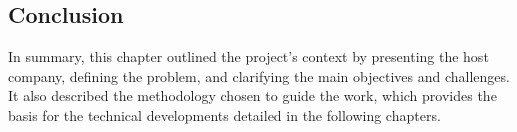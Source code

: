 \begin{spacing}{1.2}
\section*{Conclusion}
In summary, this chapter outlined the project’s context by presenting the host company, defining the problem, and clarifying the main objectives and challenges. It also described the methodology chosen to guide the work, which provides the basis for the technical developments detailed in the following chapters.



\end{spacing}
